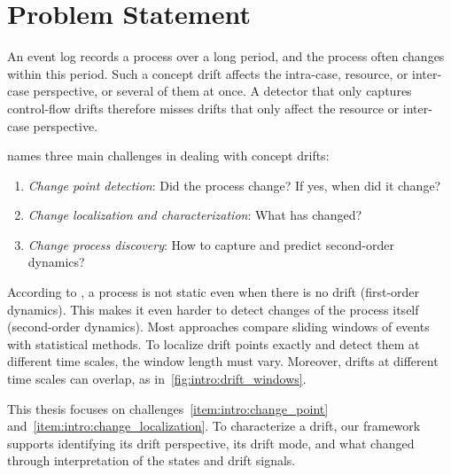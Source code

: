\section{Problem Statement}
\label{sec:intro_ssec:probs}
An event log records a process over a long period, and the process often changes within this period. Such a concept drift affects the intra-case, resource, or inter-case perspective, or several of them at once. A detector that only captures control-flow drifts therefore misses drifts that only affect the resource or inter-case perspective.

\Textcite{vanderaalst2016process} names three main challenges in dealing with concept drifts:
\begin{enumerate}
	\item\label{item:intro:change_point} \emph{Change point detection}: Did the process change? If yes, when did it change?
	\item\label{item:intro:change_localization} \emph{Change localization and characterization}: What has changed?
	\item\label{item:intro:change_process} \emph{Change process discovery}: How to capture and predict second-order dynamics?
\end{enumerate}

According to \citeauthor{vanderaalst2016process}, a process is not static even when there is no drift (first-order dynamics). This makes it even harder to detect changes of the process itself (second-order dynamics). Most approaches compare sliding windows of events with statistical methods. To localize drift points exactly and detect them at different time scales, the window length must vary. Moreover, drifts at different time scales can overlap, as in~\cref{fig:intro:drift_windows}.

This thesis focuses on challenges~\ref{item:intro:change_point} and~\ref{item:intro:change_localization}. To characterize a drift, our framework supports identifying its drift perspective, its drift mode, and what changed through interpretation of the states and drift signals.

